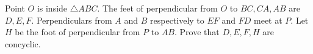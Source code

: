 Point $O$ is inside $\triangle ABC$. The feet of perpendicular from $O$ to $BC,CA,AB$ are $D,E,F$. Perpendiculars from $A$ and $B$ respectively to $EF$ and $FD$ meet at $P$. Let $H$ be the foot of perpendicular from $P$ to $AB$. Prove that $D,E,F,H$ are concyclic.
